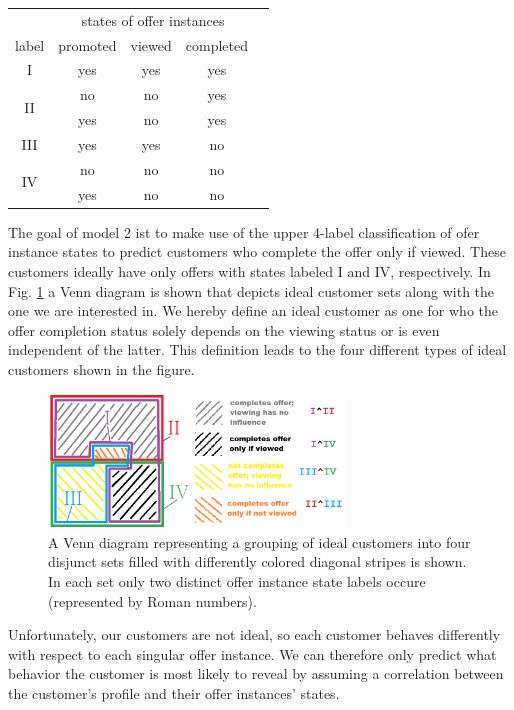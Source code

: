 \documentclass[11pt]{article} %
\begin{document}
\begin{center}
{\Large
\begin{tabular}{|c||c|c|c|c|}
 \hline
&\multicolumn{3}{c|}{  states of offer instances}\\
 label & promoted & viewed & completed \\ 
\hline
\hline
I & yes & yes & yes \\ 
\hline
\multirow{ 2}{*}{II} & no & no & yes \\ 
 & yes & no & yes \\ 
\hline
III & yes & yes & no \\ 
\hline
\multirow{ 2}{*}{IV} &no & no & no \\ 
 & yes & no & no \\ 
 \hline
\end{tabular}
}
\end{center}

The goal of model 2 ist to make use of the upper 4-label classification of ofer instance states to predict customers who complete the offer only if viewed.
These customers ideally have only offers with states labeled I and IV, respectively. In Fig. \ref{fig:venn2} a Venn diagram is shown that depicts ideal customer sets along with the one we are interested in. We hereby define an ideal customer as one for who the offer completion status solely depends on the viewing status or is even independent of the latter.
This definition leads to the four different types of ideal customers shown in the figure.
\begin{figure}[H]
\begin{center}
\includegraphics[width=0.7\textwidth]{venn_diagram2.png}
\caption{\label{fig:venn2}A Venn diagram representing a grouping of ideal customers into four disjunct sets filled with differently colored diagonal stripes is shown. In each set only two distinct offer instance state labels occure (represented by Roman numbers). 
}
\end{center}
\end{figure}
Unfortunately, our customers are not ideal, so each customer behaves differently with respect to each singular offer instance.
We can therefore only predict what behavior the customer is most likely to reveal by assuming a correlation between the customer's profile and their offer instances' states.
\end{document}
